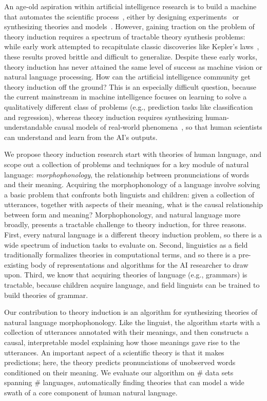 \documentclass[12pt]{article}
\begin{document}
An age-old aspiration within artificial intelligence research is to build a machine that automates the scientific process~\cite{paul1990autonomous,langley1987scientific}, either by designing experiments~\cite{sparkes2010towards} or
synthesizing theories and models~\cite{schmidt2009distilling}.
However, gaining traction on the problem of theory induction requires
a spectrum of tractable theory synthesis problems:
while early work attempted to recapitulate
classic discoveries like Kepler's laws~\cite{BACON},
these results proved brittle and difficult to generalize.
Despite these early works,
theory induction has never attained the same level of success as
machine vision or natural language processing.
How can the artificial intelligence community get theory induction off the ground?
This is an especially difficult question,
because the current mainstream in machine intelligence focuses on
learning to solve a qualitatively different class of problems (e.g., prediction tasks like classification and regression),
whereas theory induction requires
synthesizing human-understandable causal models of real-world phenomena~\cite{pearl2009causality},
so that human scientists can understand and learn from the AI's outputs.


We propose theory induction research start with theories of human
language, and scope out a collection of problems and techniques for a
key module of natural language: \emph{morphophonology}, the
relationship between pronunciations of words and their meaning.
Acquiring the morphophonology of a language involve solving a basic
problem that confronts both linguists and children: given a collection
of utterances, together with aspects of their meaning, what is the
causal relationship between form and meaning?  Morphophonology, and
natural language more broadly, presents a tractable challenge to
theory induction, for three reasons.  First, every natural language is
a different theory induction problem, so there is a wide spectrum of
induction tasks to evaluate on.  Second, linguistics as a field
traditionally formalizes theories in computational terms, and so there
is a pre-existing body of representations and algorithms for the AI
researcher to draw upon.  Third, we know that acquiring theories of
language (e.g., grammars) is tractable, because children 
acquire language, and field linguists can be trained to build theories of grammar.

Our contribution to theory induction is
an algorithm for synthesizing
theories of natural language morphophonology.
Like the linguist,
the algorithm starts with
a collection of utterances 
annotated with their meanings,
and then constructs a
causal, interpretable model explaining how
those meanings gave rise to the utterances.
An important aspect of a scientific theory is
that it makes predictions; here,
the theory predicts pronunciations of unobserved words conditioned on their meaning.
We evaluate our algorithm on \# data sets spanning \# languages,
automatically finding theories that can model a wide swath of a core component of human natural language.
\end{document}
